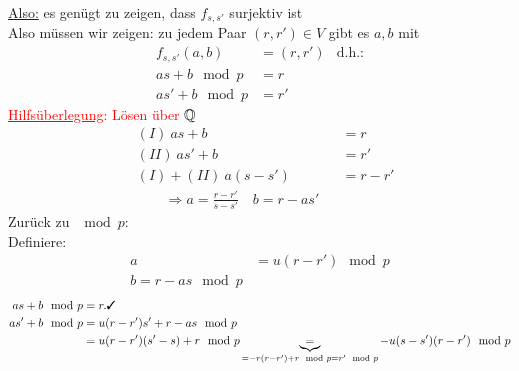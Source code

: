 \begin{center}
\end{center}
\underline{Also:} es genügt zu zeigen, dass $f_{s, s'}$ surjektiv ist\\
Also müssen wir zeigen: zu jedem Paar $(r, r') \in V$ gibt es $a, b$ mit
\begin{align*}
    f_{s, s'}(a, b) &= (r, r') & \text{d.h.:}\\
    as + b \mod p &= r\\
    as' + b \mod p &= r'
\end{align*}
\textcolor{red}{\underline{Hilfsüberlegung}: Lösen über $\mathbb Q$}
\color{red}
\begin{align*}
    &(I)\: as + b &&= r\\
    &(II)\: as' + b &&= r'\\
    &(I) + (II)\: a(s - s') &&= r- r'\\
    &\quad\quad \Rightarrow a = \frac{r - r'}{s - s'} \quad b = r - as'
\end{align*}
\color{black}
Zurück zu $\mod p$:\\
Definiere:
\begin{align*}
    a &= u(r - r') \mod p\\
    b = r - as \mod p
\end{align*}
\begin{align*}
    as + b \mod p &= r. \cmark\\
    as' + b \mod p &= u(r - r')s' + r - as \mod p\\
    &= u (r- r') (s' - s) + r \mod p \underbrace{=}_{=-r(r - r') + r \mod p = r' \mod p} -u(s - s')(r - r') \mod p
\end{align*}